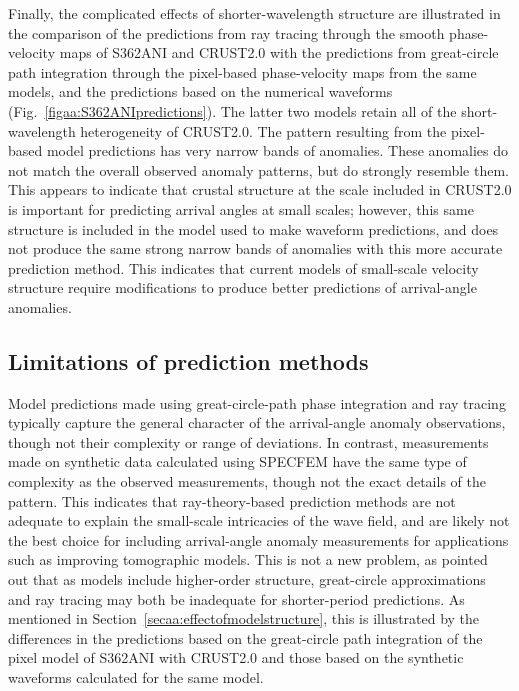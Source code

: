 \documentclass[12pt,oneside]{book}
\begin{document}
Finally, the complicated effects of shorter-wavelength structure are illustrated in the comparison of the predictions from ray tracing through the smooth phase-velocity maps of S362ANI and CRUST2.0 with the predictions from great-circle path integration through the pixel-based phase-velocity maps from the same models, and the predictions based on the numerical waveforms (Fig.~\ref{figaa:S362ANIpredictions}). The latter two models retain all of the short-wavelength heterogeneity of CRUST2.0. The pattern resulting from the pixel-based model predictions has very narrow bands of anomalies. These anomalies do not match the overall observed anomaly patterns, but do strongly resemble them. This appears to indicate that crustal structure at the scale included in CRUST2.0 is important for predicting arrival angles at small scales; however, this same structure is included in the model used to make waveform predictions, and does not produce the same strong narrow bands of anomalies with this more accurate prediction method. This indicates that current models of small-scale velocity structure require modifications to produce better predictions of arrival-angle anomalies. 

\subsection{Limitations of prediction methods}
Model predictions made using great-circle-path phase integration and ray tracing typically capture the general character of the arrival-angle anomaly observations, though not their complexity or range of deviations. In contrast, measurements made on synthetic data calculated using SPECFEM have the same type of complexity as the observed measurements, though not the exact details of the pattern. This indicates that ray-theory-based prediction methods are not adequate to explain the small-scale intricacies of the wave field, and are likely not the best choice for including arrival-angle anomaly measurements for applications such as improving tomographic models. This is not a new problem, as \citet{LaskeMasters1996} pointed out that as models include higher-order structure, great-circle approximations and ray tracing may both be inadequate for shorter-period predictions. As mentioned in Section~\ref{secaa:effectofmodelstructure}, this is illustrated by the differences in the predictions based on the great-circle path integration of the pixel model of S362ANI with CRUST2.0 and those based on the synthetic waveforms calculated for the same model. 
\end{document}
